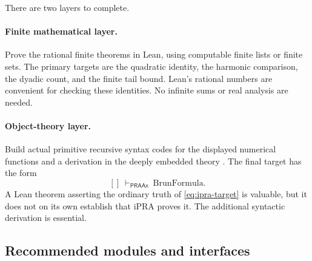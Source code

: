 There are two layers to complete.

\paragraph{Finite mathematical layer.}
Prove the rational finite theorems in Lean, using computable finite lists
or finite sets. The primary targets are the quadratic identity, the
harmonic comparison, the dyadic count, and the finite tail bound.
Lean's rational numbers are convenient for checking these identities.
No infinite sums or real analysis are needed.

\paragraph{Object-theory layer.}
Build actual primitive recursive syntax codes for the displayed numerical
functions and a derivation in the deeply embedded theory .
The final target has the form
\[
 []\ \vdash_{\mathsf{PRAAx}}\ \mathrm{BrunFormula}.
\]
A Lean theorem asserting the ordinary truth of
\eqref{eq:ipra-target} is valuable, but it does not on its own establish
that iPRA proves it. The additional syntactic derivation is essential.

\subsection{Recommended modules and interfaces}

